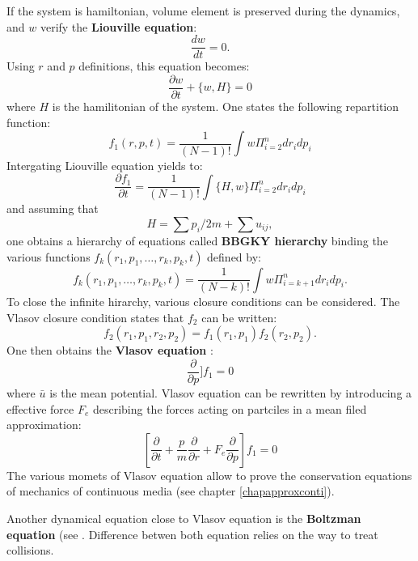 \documentclass[12pt]{book}
\begin{document}
If the system is hamiltonian, volume element is
preserved during the dynamics, and $w$ verify the {\bf Liouville equation}:
\begin{equation}
\frac{dw}{dt}=0.
\end{equation}
Using $r$ and $p$ definitions, this equation becomes:
\begin{equation}
\frac{\partial w}{\partial t}+\{w,H\}=0
\end{equation}
where $H$ is the hamilitonian of the system. One states the following
repartition function:
\begin{equation}
f_1(r,p,t)=\frac{1}{(N-1)!}\int w \Pi_{i=2}^n dr_idp_i
\end{equation}
Intergating Liouville equation yields to:
\begin{equation}
\frac{\partial f_1}{\partial t}=\frac{1}{(N-1)!}\int \{H,w\} \Pi_{i=2}^n dr_idp_i
\end{equation}
and assuming that
\begin{equation}
H=\sum p_i/2m+\sum u_{ij},
\end{equation}
one obtains a hierarchy of equations called
{\bf BBGKY hierarchy}
binding the various functions
$f_k(r_1,p_1,\dots,r_k,p_k,t)$ defined by:
\begin{equation}
f_k(r_1,p_1,\dots,r_k,p_k,t)=\frac{1}{(N-k)!}\int w \Pi_{i=k+1}^n
dr_idp_i.
\end{equation} 
To close the infinite hirarchy, various closure conditions can be
considered. The Vlasov closure condition states that $f_2$ can be written: 
\begin{equation}
f_2(r_1,p_1,r_2,p_2)=f_1(r_1,p_1)f_2(r_2,p_2).
\end{equation}
One then obtains the {\bf Vlasov equation} :
\begin{equation}
[\frac{\partial}{\partial t}+\frac{p}{m}\frac{\partial}{\partial r}+[F-\frac{\partial \bar{u}}{\partial r}]\frac{\partial }{\partial p}]f_1=0
\end{equation}
where $\bar{u}$ is the mean potential. Vlasov equation can be rewritten by
introducing a effective force $F_e$ describing the forces acting on partciles
in a mean filed approximation:
\begin{equation}\label{eqvlasov}
[\frac{\partial}{\partial t}+\frac{p}{m}\frac{\partial}{\partial r}+F_e\frac{\partial }{\partial p}]f_1=0
\end{equation}
The various momets of Vlasov equation allow to prove the conservation
equations of mechanics of continuous media (see chapter \ref{chapapproxconti}).
\begin{rem}
Another dynamical equation close to Vlasov equation is the {\bf Boltzman
  equation}
(see \cite{ph:physt:Diu89}. Difference betwen both
equation relies on the way to treat collisions.
\end{rem}
\end{document}
